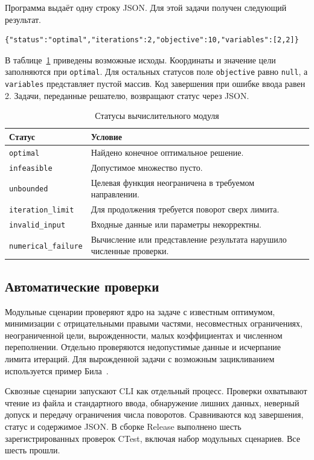 Программа выдаёт одну строку JSON. Для этой задачи получен следующий результат.

\begin{lstlisting}[basicstyle=\ttfamily\small,breaklines=true]
{"status":"optimal","iterations":2,"objective":10,"variables":[2,2]}
\end{lstlisting}

В таблице~\ref{tab:solver-statuses} приведены возможные исходы. Координаты
и значение цели заполняются при \texttt{optimal}. Для остальных статусов
поле \texttt{objective} равно \texttt{null}, а \texttt{variables}
представляет пустой массив. Код завершения при ошибке ввода равен 2.
Задачи, переданные решателю, возвращают статус через JSON.

\begin{table}[htbp]
  \caption{Статусы вычислительного модуля}
  \label{tab:solver-statuses}
  \begin{tabularx}{\textwidth}{@{}l X@{}}
    \toprule
    Статус & Условие \\
    \midrule
    \texttt{optimal} & Найдено конечное оптимальное решение. \\
    \texttt{infeasible} & Допустимое множество пусто. \\
    \texttt{unbounded} & Целевая функция неограничена в требуемом направлении. \\
    \texttt{iteration\_limit} & Для продолжения требуется поворот сверх лимита. \\
    \texttt{invalid\_input} & Входные данные или параметры некорректны. \\
    \texttt{numerical\_failure} & Вычисление или представление результата
      нарушило численные проверки. \\
    \bottomrule
  \end{tabularx}
\end{table}

\subsection{Автоматические проверки}

Модульные сценарии проверяют ядро на задаче с известным оптимумом,
минимизации с отрицательными правыми частями, несовместных ограничениях,
неограниченной цели, вырожденности, малых коэффициентах и численном
переполнении. Отдельно проверяются недопустимые данные и исчерпание лимита
итераций. Для вырожденной задачи с возможным зацикливанием используется
пример Била~\cite[с.~127]{kolman1995}.

Сквозные сценарии запускают CLI как отдельный процесс. Проверки охватывают
чтение из файла и стандартного ввода, обнаружение лишних данных, неверный
допуск и передачу ограничения числа поворотов. Сравниваются код завершения,
статус и содержимое JSON. В сборке Release выполнено шесть зарегистрированных
проверок CTest, включая набор модульных сценариев. Все шесть прошли.
